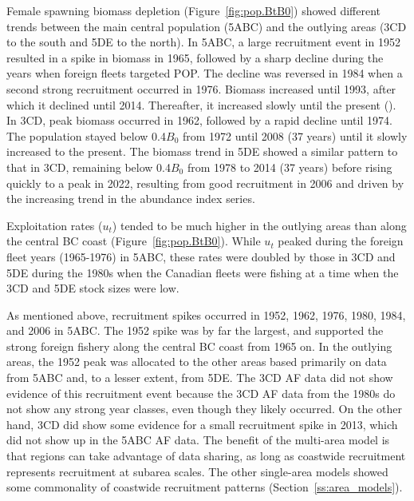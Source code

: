 \documentclass[11pt]{book}
\begin{document}
Female spawning biomass depletion (Figure~\ref{fig:pop.BtB0}) showed different trends between the main central population (5ABC) and the outlying areas (3CD to the south and 5DE to the north).
In 5ABC, a large recruitment event in 1952 resulted in a spike in biomass in 1965, followed by a sharp decline during the years when foreign fleets targeted POP.
The decline was reversed in 1984 when a second strong recruitment occurred in 1976. 
Biomass increased until 1993, after which it declined until 2014. 
Thereafter, it increased slowly until the present (\currYear).
In 3CD, peak biomass occurred in 1962, followed by a rapid decline until 1974.
The population stayed below 0.4$B_0$ from 1972 until 2008 (37 years) until it slowly increased to the present.
The biomass trend in 5DE showed a similar pattern to that in 3CD, remaining below 0.4$B_0$ from 1978 to 2014 (37 years) before rising quickly to a peak in 2022, resulting from good recruitment in 2006 and driven by the increasing trend in the abundance index series.

Exploitation rates ($u_t$) tended to be much higher in the outlying areas than along the central BC coast (Figure~\ref{fig:pop.BtB0}).
While $u_t$ peaked during the foreign fleet years (1965-1976) in 5ABC, these rates were doubled by those in 3CD and 5DE during the 1980s when the Canadian fleets were fishing at a time when the 3CD and 5DE stock sizes were low.

As mentioned above, recruitment spikes occurred in 1952, 1962, 1976, 1980, 1984, and 2006 in 5ABC.
The 1952 spike was by far the largest, and supported the strong foreign fishery along the central BC coast from 1965 on.
In the outlying areas, the 1952 peak was allocated to the other areas based primarily on data from 5ABC and, to a lesser extent, from 5DE.
The 3CD AF data did not show evidence of this recruitment event because the 3CD AF data from the 1980s do not show any strong year classes, even though they likely occurred. 
On the other hand, 3CD did show some evidence for a small recruitment spike in 2013, which did not show up in the 5ABC AF data.
The benefit of the multi-area model is that regions can take advantage of data sharing, as long as coastwide recruitment represents recruitment at subarea scales.
The other single-area models showed some commonality of coastwide recruitment patterns (Section~\ref{ss:area_models}).



\graphicspath{{C:/Users/haighr/Files/GFish/PSARC/PSARC_2020s/PSARC23/POP/Data/SS/POP2023/Run21/MPD.21.01.v3/english/}}
\clearpage
\end{document}
